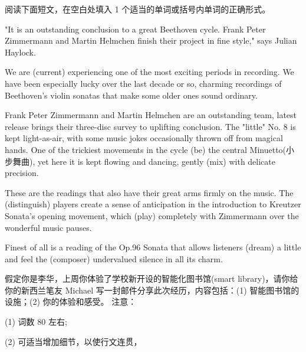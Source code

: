 \documentclass{英语试卷}
\begin{document}
\par 阅读下面短文，在空白处填入 1 个适当的单词或括号内单词的正确形式。\par
\par "It is an outstanding conclusion to a great Beethoven cycle. Frank Peter Zimmermann and Martin Helmchen finish their project in fine style," says Julian Haylock.\par
\par We are  (current) experiencing one of the most exciting periods in recording. We have been especially lucky over the last decade or so,  charming recordings of Beethoven's violin sonatas that make some older ones sound ordinary.\par
\par Frank Peter Zimmermann and Martin Helmchen are an outstanding team,  latest release brings their three-disc survey to  uplifting conclusion. The "little" No. 8 is kept light-as-air, with some music jokes occasionally thrown off from magical hands. One of the trickiest movements in the cycle  (be) the central Minuetto(小步舞曲), yet here it is kept flowing and dancing, gently  (mix) with delicate precision.\par
\par These are the readings that also have their great arms firmly on the music. The  (distinguish) players create a sense of anticipation in the introduction to Kreutzer Sonata's opening movement, which  (play) completely with Zimmermann over the wonderful music pauses.\par
\par Finest of all is a reading of the Op.96 Sonata that allows listeners  (dream) a little and feel the  (composer) undervalued silence in all its charm.\par
{}
\par 假定你是李华，上周你体验了学校新开设的智能化图书馆(smart library)，请你给你的新西兰笔友 Michael 写一封邮件分享此次经历，内容包括：(1) 智能图书馆的设施；(2) 你的体验和感受。 注意：\par
\par (1) 词数 80 左右;\par
\par (2) 可适当增加细节，以使行文连贯，\par
\end{document}
